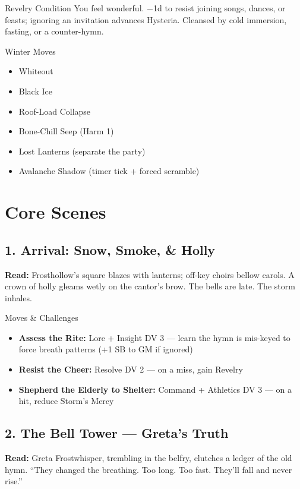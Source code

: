 \documentclass[11pt]{article}
\begin{document}
\begin{mechanicsbox}{Revelry Condition}
You feel wonderful. −1d to resist joining songs, dances, or feasts; ignoring an invitation advances Hysteria. Cleansed by cold immersion, fasting, or a counter-hymn.
\end{mechanicsbox}

\begin{mechanicsbox}{Winter Moves}
\begin{itemize}
    \item Whiteout
    \item Black Ice
    \item Roof-Load Collapse
    \item Bone-Chill Seep (Harm 1)
    \item Lost Lanterns (separate the party)
    \item Avalanche Shadow (timer tick + forced scramble)
\end{itemize}
\end{mechanicsbox}

\section*{Core Scenes}

\subsection*{1. Arrival: Snow, Smoke, \& Holly}
\textbf{Read:} Frosthollow's square blazes with lanterns; off-key choirs bellow carols. A crown of holly gleams wetly on the cantor's brow. The bells are late. The storm inhales.

\begin{mechanicsbox}{Moves \& Challenges}
\begin{itemize}
    \item \textbf{Assess the Rite:} Lore + Insight DV 3 --- learn the hymn is mis-keyed to force breath patterns (+1 SB to GM if ignored)
    \item \textbf{Resist the Cheer:} Resolve DV 2 --- on a miss, gain Revelry
    \item \textbf{Shepherd the Elderly to Shelter:} Command + Athletics DV 3 --- on a hit, reduce Storm's Mercy
\end{itemize}
\end{mechanicsbox}

\subsection*{2. The Bell Tower --- Greta's Truth}
\textbf{Read:} Greta Frostwhisper, trembling in the belfry, clutches a ledger of the old hymn. ``They changed the breathing. Too long. Too fast. They'll fall and never rise.''
\end{document}

